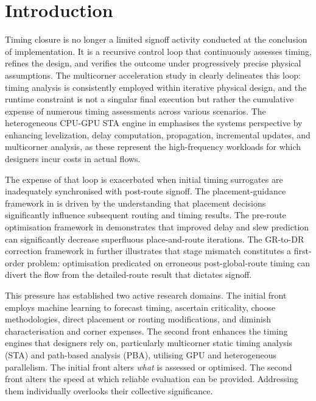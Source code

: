\documentclass[num-refs]{wiley-article}
\begin{document}
  \section{Introduction}

  Timing closure is no longer a limited signoff activity conducted at the conclusion of implementation. It is a recursive control loop that continuously assesses timing, refines the design, and verifies the outcome under progressively precise physical assumptions. The multicorner acceleration study in \cite{ref16} clearly delineates this loop: timing analysis is consistently employed within iterative physical design, and the runtime constraint is not a singular final execution but rather the cumulative expense of numerous timing assessments across various scenarios. The heterogeneous CPU-GPU STA engine in \cite{ref22} emphasises the systems perspective by enhancing levelization, delay computation, propagation, incremental updates, and multicorner analysis, as these represent the high-frequency workloads for which designers incur costs in actual flows.


  The expense of that loop is exacerbated when initial timing surrogates are inadequately synchronised with post-route signoff. The placement-guidance framework in \cite{ref1} is driven by the understanding that placement decisions significantly influence subsequent routing and timing results. The pre-route optimisation framework in \cite{ref17} demonstrates that improved delay and slew prediction can significantly decrease superfluous place-and-route iterations. The GR-to-DR correction framework in \cite{ref10} further illustrates that stage mismatch constitutes a first-order problem: optimisation predicated on erroneous post-global-route timing can divert the flow from the detailed-route result that dictates signoff.


This pressure has established two active research domains. The initial front employs machine learning to forecast timing, ascertain criticality, choose methodologies, direct placement or routing modifications, and diminish characterisation and corner expenses. The second front enhances the timing engines that designers rely on, particularly multicorner static timing analysis (STA) and path-based analysis (PBA), utilising GPU and heterogeneous parallelism. The initial front alters \emph{what} is assessed or optimised. The second front alters the speed at which reliable evaluation can be provided. Addressing them individually overlooks their collective significance.
\end{document}
